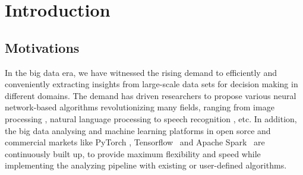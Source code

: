 \documentclass [PhD] {uclathes}
\begin{document}






\chapter{Introduction}


\section{Motivations}
In the big data era, we have witnessed the rising demand to efficiently and conveniently extracting insights  from large-scale data sets for decision making in different domains. The demand has driven researchers to propose various  neural network-based algorithms revolutionizing many fields, ranging from image processing \citep{he2016deep}, natural language processing \citep{devlin2018bert} to speech recognition \citep{amodei2016deep}, etc. In addition, the big data analysing and machine learning platforms  in open sorce and commercial markets  like PyTorch \citep{paszke2019pytorch}, Tensorflow~\citep{abadi2016tensorflow} and Apache Spark~\citep{zaharia2010spark} are continuously built up, to provide maximum flexibility and speed while implementing the analyzing pipeline with existing or user-defined algorithms. 
\end{document}
